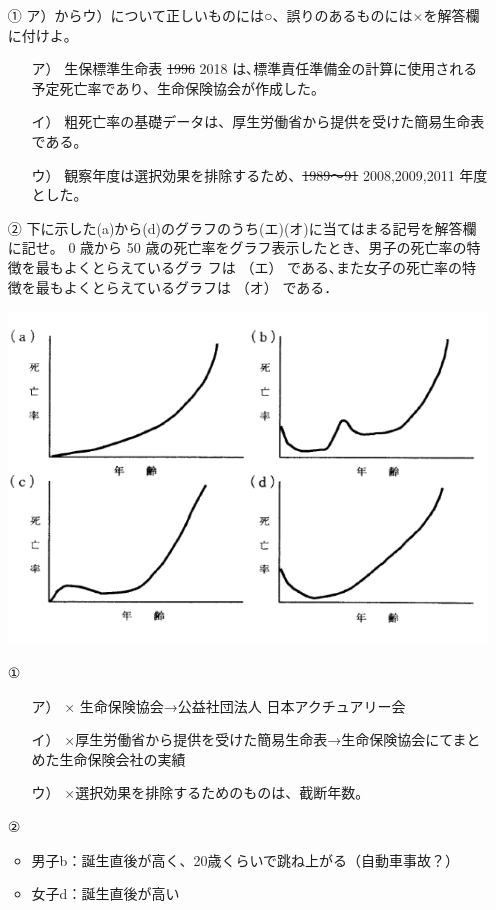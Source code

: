 \documentclass[report,gutter=10mm,fore-edge=10mm,uplatex,dvipdfmx]{jlreq}
\begin{document}
\begin{itemize}
\tightlist
 \item [①]  ア）からウ）について正しいものには○、誤りのあるものには×を解答欄に付けよ。
\begin{itemize}
\tightlist
 \item [ ア）]生保標準生命表 \sout{1996} 2018 は､標準責任準備金の計算に使用される予定死亡率であり、生命保険協会が作成した。
 \item [ イ）]粗死亡率の基礎データは、厚生労働省から提供を受けた簡易生命表である。
 \item [ ウ）]観察年度は選択効果を排除するため、\sout{1989～91} 2008,2009,2011 年度とした。
\end{itemize}
 \item [②] 下に示した(a)から(d)のグラフのうち(エ)(オ)に当てはまる記号を解答欄に記せ。
 0 歳から 50 歳の死亡率をグラフ表示したとき、男子の死亡率の特徴を最もよくとらえているグラ
 フは （エ） である､また女子の死亡率の特徴を最もよくとらえているグラフは （オ） である．

       \includegraphics[scale=0.25]{images/probH161-1-3.png}

\end{itemize}



\begin{itemize}
\tightlist
 \item [①]
\begin{itemize}
\tightlist
 \item [ア）] × 生命保険協会→公益社団法人 日本アクチュアリー会
 \item [イ）]×厚生労働省から提供を受けた簡易生命表→生命保険協会にてまとめた生命保険会社の実績
 \item [ウ）]×選択効果を排除するためのものは、截断年数。
\end{itemize}
 \item [②]
\begin{itemize}
\tightlist
 \item 男子b：誕生直後が高く、20歳くらいで跳ね上がる（自動車事故？）
 \item  女子d：誕生直後が高い
\end{itemize}
\end{itemize}
\end{document}
